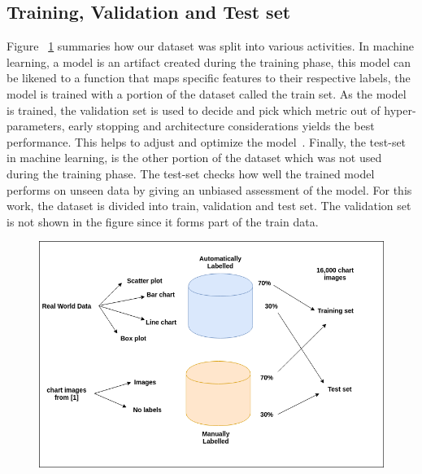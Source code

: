 \documentclass[12pt, a4paper,oneside]{report}
\begin{document}
\subsection{Training, Validation and Test set}
Figure ~\ref{fig:approach} summaries how our dataset was split into various activities. In machine learning, a model is an artifact created during the training phase, this model can be likened to a function that maps specific features to their respective labels, the model is trained with a portion of the dataset called the train set. As the model is trained, the validation set is used to decide and pick which metric out of hyper-parameters, early stopping and architecture considerations yields the best performance. This helps to adjust and optimize the model~\cite{validation}. Finally, the test-set in machine learning, is the other portion of the dataset which was not used during the training phase. The test-set checks how well the trained model performs on unseen data by giving an unbiased assessment of the model. For this work, the dataset is divided into train, validation and test set. The validation set is not shown in the figure since it forms part of the train data.

\begin{figure}[!htbp]
\includegraphics [scale=0.5] {approach}
\label{fig:approach}
\end{figure}
\end{document}
